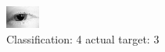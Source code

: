 \begin{figure}[h!]
\begin{center}
\includegraphics[width=0.60\columnwidth]{figures/ID100_class_4_target_3.png}
\end{center}
\caption{ Classification: 4 actual target: 3}
\label{fig:ID100_class_4_target_3}
\end{figure}
